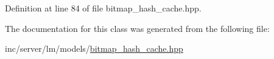 Definition at line 84 of file bitmap\+\_\+hash\+\_\+cache.\+hpp.



The documentation for this class was generated from the following file\+:\begin{DoxyCompactItemize}
\item 
inc/server/lm/models/\hyperlink{bitmap__hash__cache_8hpp}{bitmap\+\_\+hash\+\_\+cache.\+hpp}\end{DoxyCompactItemize}
